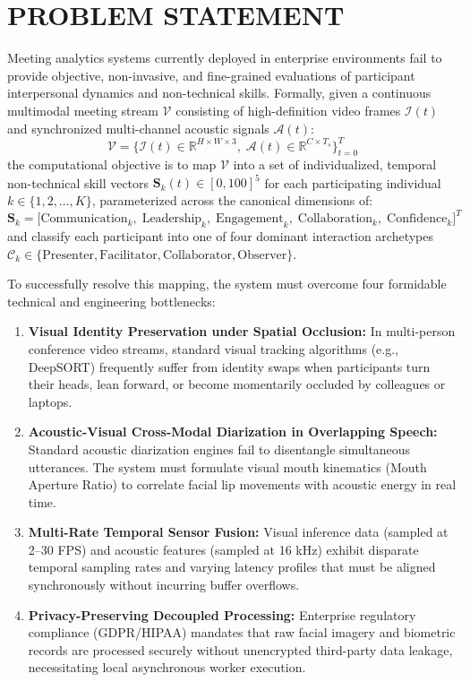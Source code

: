 \documentclass[12pt,a4paper,oneside]{report}
\begin{document}
\section{PROBLEM STATEMENT}
Meeting analytics systems currently deployed in enterprise environments fail to provide objective, non-invasive, and fine-grained evaluations of participant interpersonal dynamics and non-technical skills. Formally, given a continuous multimodal meeting stream $\mathcal{V}$ consisting of high-definition video frames $\mathcal{I}(t)$ and synchronized multi-channel acoustic signals $\mathcal{A}(t)$:
\begin{equation}
    \mathcal{V} = \Big\{ \mathcal{I}(t) \in \mathbb{R}^{H \times W \times 3}, \; \mathcal{A}(t) \in \mathbb{R}^{C \times T_s} \Big\}_{t=0}^T
\end{equation}
the computational objective is to map $\mathcal{V}$ into a set of individualized, temporal non-technical skill vectors $\mathbf{S}_k(t) \in [0, 100]^5$ for each participating individual $k \in \{1, 2, \dots, K\}$, parameterized across the canonical dimensions of:
\begin{equation}
    \mathbf{S}_k = \Big[ \text{Communication}_k, \; \text{Leadership}_k, \; \text{Engagement}_k, \; \text{Collaboration}_k, \; \text{Confidence}_k \Big]^T
\end{equation}
and classify each participant into one of four dominant interaction archetypes $\mathcal{C}_k \in \{\text{Presenter}, \text{Facilitator}, \text{Collaborator}, \text{Observer}\}$.

To successfully resolve this mapping, the system must overcome four formidable technical and engineering bottlenecks:
\begin{enumerate}
    \item \textbf{Visual Identity Preservation under Spatial Occlusion:} In multi-person conference video streams, standard visual tracking algorithms (e.g., DeepSORT) frequently suffer from identity swaps when participants turn their heads, lean forward, or become momentarily occluded by colleagues or laptops.
    \item \textbf{Acoustic-Visual Cross-Modal Diarization in Overlapping Speech:} Standard acoustic diarization engines fail to disentangle simultaneous utterances. The system must formulate visual mouth kinematics (Mouth Aperture Ratio) to correlate facial lip movements with acoustic energy in real time.
    \item \textbf{Multi-Rate Temporal Sensor Fusion:} Visual inference data (sampled at 2--30 FPS) and acoustic features (sampled at 16 kHz) exhibit disparate temporal sampling rates and varying latency profiles that must be aligned synchronously without incurring buffer overflows.
    \item \textbf{Privacy-Preserving Decoupled Processing:} Enterprise regulatory compliance (GDPR/HIPAA) mandates that raw facial imagery and biometric records are processed securely without unencrypted third-party data leakage, necessitating local asynchronous worker execution.
\end{enumerate}
\end{document}
